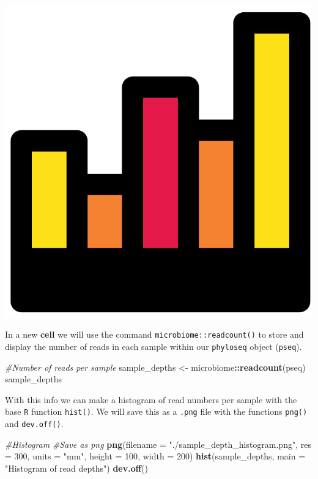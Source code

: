 \documentclass[
]{book}
\newenvironment{Shaded}{\begin{snugshade}}{\end{snugshade}}
\newcommand{\AttributeTok}[1]{\textcolor[rgb]{0.13,0.29,0.53}{#1}}
\newcommand{\CommentTok}[1]{\textcolor[rgb]{0.56,0.35,0.01}{\textit{#1}}}
\newcommand{\DecValTok}[1]{\textcolor[rgb]{0.00,0.00,0.81}{#1}}
\newcommand{\FunctionTok}[1]{\textcolor[rgb]{0.13,0.29,0.53}{\textbf{#1}}}
\newcommand{\NormalTok}[1]{#1}
\newcommand{\OtherTok}[1]{\textcolor[rgb]{0.56,0.35,0.01}{#1}}
\newcommand{\SpecialCharTok}[1]{\textcolor[rgb]{0.81,0.36,0.00}{\textbf{#1}}}
\newcommand{\StringTok}[1]{\textcolor[rgb]{0.31,0.60,0.02}{#1}}
\begin{document}
\includegraphics{figures/histogram.png}

In a new \textbf{cell} we will use the command \texttt{microbiome::readcount()} to store and display the number of reads in each sample within our \texttt{phyloseq} object (\texttt{pseq}).

\begin{Shaded}
\begin{Highlighting}[]
\CommentTok{\#Number of reads per sample}
\NormalTok{sample\_depths }\OtherTok{\textless{}{-}}\NormalTok{ microbiome}\SpecialCharTok{::}\FunctionTok{readcount}\NormalTok{(pseq)}
\NormalTok{sample\_depths}
\end{Highlighting}
\end{Shaded}

With this info we can make a histogram of read numbers per sample with the base \texttt{R} function \texttt{hist()}.
We will save this as a \texttt{.png} file with the functions \texttt{png()} and \texttt{dev.off()}.

\begin{Shaded}
\begin{Highlighting}[]
\CommentTok{\#Histogram}
\CommentTok{\#Save as png}
\FunctionTok{png}\NormalTok{(}\AttributeTok{filename =} \StringTok{"./sample\_depth\_histogram.png"}\NormalTok{, }\AttributeTok{res =} \DecValTok{300}\NormalTok{,}
    \AttributeTok{units =} \StringTok{"mm"}\NormalTok{, }\AttributeTok{height =} \DecValTok{100}\NormalTok{, }\AttributeTok{width =} \DecValTok{200}\NormalTok{)}
\FunctionTok{hist}\NormalTok{(sample\_depths, }\AttributeTok{main =} \StringTok{"Histogram of read depths"}\NormalTok{)}
\FunctionTok{dev.off}\NormalTok{()}
\end{Highlighting}
\end{Shaded}
\end{document}
